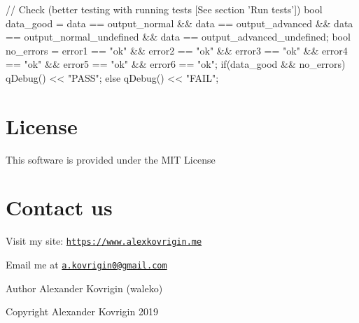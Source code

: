 \begin{DoxyCode}
\textcolor{comment}{// Check (better testing with running tests [See section 'Run tests'])}
\textcolor{keywordtype}{bool} data\_good =
    data == output\_normal &&
    data == output\_advanced &&
    data == output\_normal\_undefined &&
    data == output\_advanced\_undefined;
\textcolor{keywordtype}{bool} no\_errors =
    error1 == \textcolor{stringliteral}{"ok"} &&
    error2 == \textcolor{stringliteral}{"ok"} &&
    error3 == \textcolor{stringliteral}{"ok"} &&
    error4 == \textcolor{stringliteral}{"ok"} &&
    error5 == \textcolor{stringliteral}{"ok"} &&
    error6 == \textcolor{stringliteral}{"ok"};
\textcolor{keywordflow}{if}(data\_good && no\_errors)
    qDebug() << \textcolor{stringliteral}{"PASS"};
\textcolor{keywordflow}{else}
    qDebug() << \textcolor{stringliteral}{"FAIL"};
\end{DoxyCode}
\hypertarget{index_license}{}\section{License}\label{index_license}
This software is provided under the M\+IT License\hypertarget{index_contact}{}\section{Contact us}\label{index_contact}
Visit my site\+: \href{https://www.alexkovrigin.me}{\tt https\+://www.\+alexkovrigin.\+me}

Email me at \href{mailto:a.kovrigin0@gmail.com}{\tt a.\+kovrigin0@gmail.\+com}

\begin{DoxyAuthor}{Author}
Alexander Kovrigin (waleko) 
\end{DoxyAuthor}
\begin{DoxyCopyright}{Copyright}
Alexander Kovrigin 2019  
\end{DoxyCopyright}
